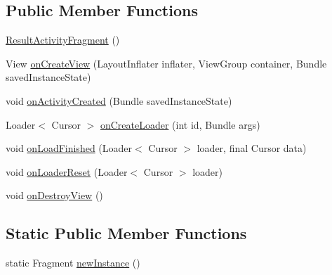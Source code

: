 \subsection*{Public Member Functions}
\begin{DoxyCompactItemize}
\item 
\hyperlink{classorg_1_1buildmlearn_1_1toolkit_1_1dictationtemplate_1_1fragment_1_1ResultActivityFragment_a2590b49e6c2189a2a0660f1fb5e0bdfb}{Result\+Activity\+Fragment} ()
\item 
View \hyperlink{classorg_1_1buildmlearn_1_1toolkit_1_1dictationtemplate_1_1fragment_1_1ResultActivityFragment_a3b40adf8f83c9e71fe44283521506ca9}{on\+Create\+View} (Layout\+Inflater inflater, View\+Group container, Bundle saved\+Instance\+State)
\item 
void \hyperlink{classorg_1_1buildmlearn_1_1toolkit_1_1dictationtemplate_1_1fragment_1_1ResultActivityFragment_ac02eaeb8fc8bdf0f009c84d4801daa98}{on\+Activity\+Created} (Bundle saved\+Instance\+State)
\item 
Loader$<$ Cursor $>$ \hyperlink{classorg_1_1buildmlearn_1_1toolkit_1_1dictationtemplate_1_1fragment_1_1ResultActivityFragment_a564ba93f24574cf6fd9720c540e2743d}{on\+Create\+Loader} (int id, Bundle args)
\item 
void \hyperlink{classorg_1_1buildmlearn_1_1toolkit_1_1dictationtemplate_1_1fragment_1_1ResultActivityFragment_a1bae96836c48406211d12e4a1303df95}{on\+Load\+Finished} (Loader$<$ Cursor $>$ loader, final Cursor data)
\item 
void \hyperlink{classorg_1_1buildmlearn_1_1toolkit_1_1dictationtemplate_1_1fragment_1_1ResultActivityFragment_a44a4b0af6da536fa82a0872bfa50fb6c}{on\+Loader\+Reset} (Loader$<$ Cursor $>$ loader)
\item 
void \hyperlink{classorg_1_1buildmlearn_1_1toolkit_1_1dictationtemplate_1_1fragment_1_1ResultActivityFragment_acbd8ac13335338fcadbf2c57d758724f}{on\+Destroy\+View} ()
\end{DoxyCompactItemize}
\subsection*{Static Public Member Functions}
\begin{DoxyCompactItemize}
\item 
static Fragment \hyperlink{classorg_1_1buildmlearn_1_1toolkit_1_1dictationtemplate_1_1fragment_1_1ResultActivityFragment_a310e90f3e1b26433eb878097c58e25bb}{new\+Instance} ()
\end{DoxyCompactItemize}
